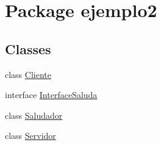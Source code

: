 \hypertarget{namespaceejemplo2}{}\section{Package ejemplo2}
\label{namespaceejemplo2}
\subsection*{Classes}
\begin{DoxyCompactItemize}
\item 
class \mbox{\hyperlink{classejemplo2_1_1_cliente}{Cliente}}
\item 
interface \mbox{\hyperlink{interfaceejemplo2_1_1_interface_saluda}{Interface\+Saluda}}
\item 
class \mbox{\hyperlink{classejemplo2_1_1_saludador}{Saludador}}
\item 
class \mbox{\hyperlink{classejemplo2_1_1_servidor}{Servidor}}
\end{DoxyCompactItemize}
